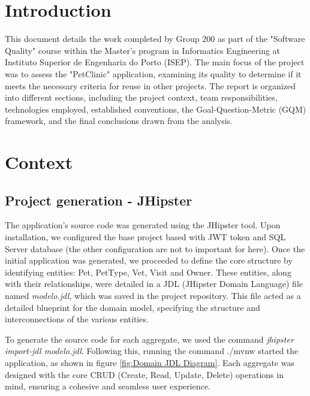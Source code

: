 \documentclass[a4paper,11pt,openright,BCOR=15mm]{scrbook}
\begin{document}
	
	
	
	\tableofcontents
	\listoffigures
	
	
	
	
	\mainmatter 
	
	
	
	\chapter{Introduction}
	
	This document details the work completed by Group 200 as part of the "Software Quality" course within the Master's program in Informatics Engineering at Instituto Superior de Engenharia do Porto (ISEP). The main focus of the project was to assess the "PetClinic" application, examining its quality to determine if it meets the necessary criteria for reuse in other projects. The report is organized into different sections, including the project context, team responsibilities, technologies employed, established conventions, the Goal-Question-Metric (GQM) framework, and the final conclusions drawn from the analysis.
	
	\chapter{Context}	
		\section{Project generation - JHipster}	
		The application’s source code was generated using the JHipster tool. Upon installation, we configured the base project based with JWT token and SQL Server database (the other configuration are not to important for here). Once the initial application was generated, we proceeded to define the core structure by identifying entities: Pet, PetType, Vet, Visit and Owner. These entities, along with their relationships, were detailed in a JDL (JHipster Domain Language) file named \textit{modelo.jdl}, which was saved in the project repository. This file acted as a detailed blueprint for the domain model, specifying the structure and interconnections of the various entities.
		
		To generate the source code for each aggregate, we used the command \textit{jhipster import-jdl modelo.jdl}. Following this, running the command ./mvnw started the application, as shown in figure \ref{fig:Domain JDL Diagram}. Each aggregate was designed with the core CRUD (Create, Read, Update, Delete) operations in mind, ensuring a cohesive and seamless user experience. 
			
\end{document}
